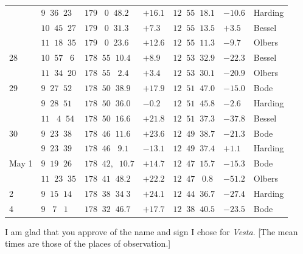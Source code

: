 \begin{longtable}{l|l|l|l|l|l|l}
        & $9\;\;36\;\;23$ & $179\;\;\;0\;\;48.2$ & $+16.1$ & $12\;\;55\;\;18.1$ & $-10.6$ & Harding \\
        & $10\;\;45\;\;27$ & $179\;\;\;0\;\;31.3$ & $+7.3$ & $12\;\;55\;\;13.5$ & $+3.5$ & Bessel \\
        & $11\;\;18\;\;35$ & $179\;\;\;0\;\;23.6$ & $+12.6$ & $12\;\;55\;\;11.3$ & $-9.7$ & Olbers \\
28      & $10\;\;57\;\;\;6$ & $178\;\;55\;\;10.4$ & $+8.9$ & $12\;\;53\;\;32.9$ & $-22.3$ & Bessel \\
        & $11\;\;34\;\;20$ & $178\;\;55\;\;\;2.4$ & $+3.4$ & $12\;\;53\;\;30.1$ & $-20.9$ & Olbers \\
29      & $9\;\;27\;\;52$ & $178\;\;50\;\;38.9$ & $+17.9$ & $12\;\;51\;\;47.0$ & $-15.0$ & Bode \\
        & $9\;\;28\;\;51$ & $178\;\;50\;\;36.0$ & $-0.2$ & $12\;\;51\;\;45.8$ & $-2.6$ & Harding \\
        & $11\;\;\;4\;\;54$ & $178\;\;50\;\;16.6$ & $+21.8$ & $12\;\;51\;\;37.3$ & $-37.8$ & Bessel \\
30      & $9\;\;23\;\;38$ & $178\;\;46\;\;11.6$ & $+23.6$ & $12\;\;49\;\;38.7$ & $-21.3$ & Bode \\
        & $9\;\;23\;\;39$ & $178\;\;46\;\;\;9.1$ & $-13.1$ & $12\;\;49\;\;37.4$ & $+1.1$ & Harding \\
May 1   & $9\;\;19\;\;26$ & $178\;\;42,\;\;10.7$ & $+14.7$ & $12\;\;47\;\;15.7$ & $-15.3$ & Bode \\
        & $11\;\;23\;\;35$ & $178\;\;41\;\;48.2$ & $+22.2$ & $12\;\;47\;\;\;0.8$ & $-51.2$ & Olbers \\
2       & $9\;\;15\;\;14$ & $178\;\;38\;\;34\;3$ & $+24.1$ & $12\;\;44\;\;36.7$ & $-27.4$ & Harding \\
4       & $9\;\;\;7\;\;\;1$ & $178\;\;32\;\;46.7$ & $+17.7$ & $12\;\;38\;\;40.5$ & $-23.5$ & Bode \\
\end{longtable}\endgroup

\par\indent I am glad that you approve of the name and sign I chose for \emph{Vesta}. [The mean times are those of the places of observation.]
